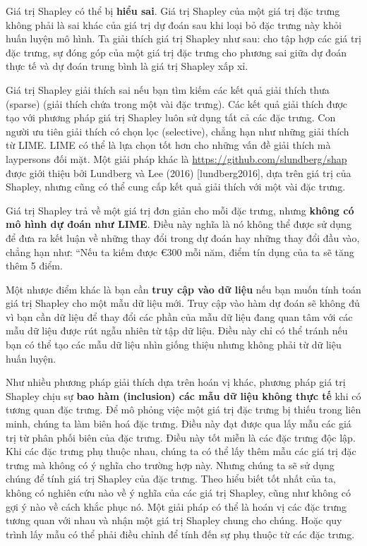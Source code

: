 Giá trị Shapley có thể bị \textbf{hiểu sai}. Giá trị Shapley của một giá trị đặc trưng không phải là sai khác của giá trị dự đoán sau khi loại bỏ đặc trưng này khỏi huấn luyện mô hình. Ta giải thích giá trị Shapley như sau: cho tập hợp các giá trị đặc trưng, sự đóng góp của một giá trị đặc trưng cho phương sai giữa dự đoán thực tế và dự đoán trung bình là giá trị Shapley xấp xỉ.

Giá trị Shapley giải thích sai nếu bạn tìm kiếm các kết quả giải thích thưa (sparse) (giải thích chứa trong một vài đặc trưng). Các kết quả giải thích được tạo với phương pháp giá trị Shapley luôn sử dụng tất cả các đặc trưng. Con người ưu tiên giải thích có chọn lọc (selective), chẳng hạn như những giải thích từ LIME. LIME có thể là lựa chọn tốt hơn cho những vấn đề giải thích mà laypersons đối mặt. Một giải pháp khác là \href{SHAP}{ https://github.com/slundberg/shap} được giới thiệu bởi Lundberg và Lee (2016) [lundberg2016], dựa trên giá trị của Shapley, nhưng cũng có thể cung cấp kết quả giải thích với một vài đặc trưng.

Giá trị Shapley trả về một giá trị đơn giản cho mỗi đặc trưng, nhưng \textbf{không có mô hình dự đoán như LIME}. Điều này nghĩa là nó không thể được sử dụng để đưa ra kết luận về những thay đổi trong dự đoán hay những thay đổi đầu vào, chẳng hạn như: ``Nếu ta kiếm được \euro300 mỗi năm, điểm tín dụng của ta sẽ tăng thêm 5 điểm.

Một nhược điểm khác là bạn cần \textbf{truy cập vào dữ liệu} nếu bạn muốn tính toán giá trị Shapley cho một mẫu dữ liệu mới. Truy cập vào hàm dự đoán sẽ không đủ vì bạn cần dữ liệu để thay đổi các phần của mẫu dữ liệu đang quan tâm với các mẫu dữ liệu được rút ngẫu nhiên từ tập dữ liệu. Điều này chỉ có thể tránh nếu bạn có thể tạo các mẫu dữ liệu nhìn giống thiệu nhưng không phải từ dữ liệu huấn luyện.

Như nhiều phương pháp giải thích dựa trên hoán vị khác, phương pháp giá trị Shapley chịu sự \textbf{bao hàm (inclusion) các mẫu dữ liệu không thực tế} khi có tương quan đặc trưng. Để mô phỏng việc một giá trị đặc trưng bị thiếu trong liên minh, chúng ta làm biên hoá đặc trưng. Điều này đạt được qua lấy mẫu các giá trị từ phân phối biên của đặc trưng. Điều này tốt miễn là các đặc trưng độc lập. Khi các đặc trưng phụ thuộc nhau, chúng ta có thể lấy thêm mẫu các giá trị đặc trưng mà không có ý nghĩa cho trường hợp này. Nhưng chúng ta sẽ sử dụng chúng để tính giá trị Shapley của đặc trưng. Theo hiểu biết tốt nhất của ta, không có nghiên cứu nào về ý nghĩa của các giá trị Shapley, cũng như không có gợi ý nào về cách khắc phục nó. Một giải pháp có thể là hoán vị các đặc trưng tương quan với nhau và nhận một giá trị Shapley chung cho chúng. Hoặc quy trình lấy mẫu có thể phải điều chỉnh để tính đến sự phụ thuộc từ các đặc trưng.

